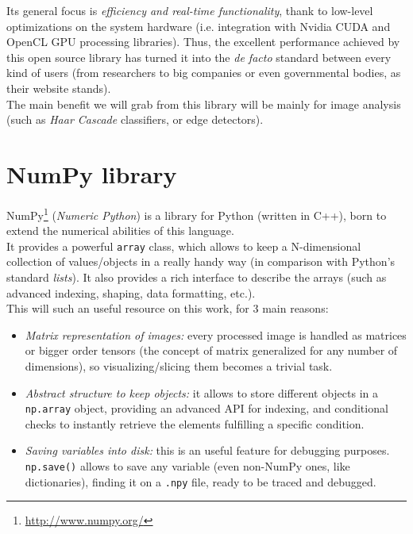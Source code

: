 	Its general focus is \emph{efficiency and real-time functionality}, thank to low-level optimizations on the system hardware (i.e. integration with Nvidia CUDA and OpenCL GPU processing libraries). Thus, the excellent performance achieved by this open source library has turned it into the \emph{de facto} standard between every kind of users (from researchers to big companies or even governmental bodies, as their website stands).\\
	
	The main benefit we will grab from this library will be mainly for image analysis (such as \emph{Haar Cascade} classifiers, or edge detectors).\\

\section{NumPy library}
	NumPy\footnote{\url{http://www.numpy.org/}} (\emph{Numeric Python}) is a library for Python (written in C++), born to extend the numerical abilities of this language.\\
	
	It provides a powerful \texttt{array} class, which allows to keep a N-dimensional collection of values/objects in a really handy way (in comparison with Python's standard \emph{lists}). It also provides a rich interface to describe the arrays (such as advanced indexing, shaping, data formatting, etc.).\\
	This will such an useful resource on this work, for 3 main reasons:
	\begin{itemize}
		\item \emph{Matrix representation of images:} every processed image is handled as matrices or bigger order tensors (the concept of matrix generalized for any number of dimensions), so visualizing/slicing them becomes a trivial task.
		\item \emph{Abstract structure to keep objects:} it allows to store different objects in a \texttt{np.array} object, providing an advanced API for indexing, and conditional checks to instantly retrieve the elements fulfilling a specific condition.
		\item \emph{Saving variables into disk:} this is an useful feature for debugging purposes. \texttt{np.save()} allows to save any variable (even non-NumPy ones, like dictionaries), finding it on a \texttt{.npy} file, ready to be traced and debugged.
	\end{itemize}

